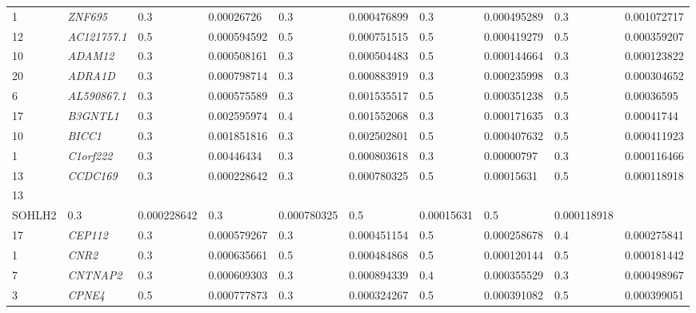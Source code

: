 \begin{refsection}
\begin{otherlanguage}{english}
\begin{scriptsize}
\begin{longtable}{llllllllll}
1 & \cellcolor[HTML]{CBCEFB}\textit{ZNF695} & 0.3 & 0.00026726 & 0.3 & 0.000476899 & 0.3 & \cellcolor[HTML]{CBCEFB}0.000495289 & 0.3 & 0.001072717 \\
12 & \cellcolor[HTML]{FE996B}\textit{AC121757.1} & 0.5 & 0.000594592 & 0.5 & 0.000751515 & 0.5 & 0.000419279 & 0.5 & 0.000359207 \\
10 & \cellcolor[HTML]{FE996B}\textit{ADAM12} & 0.3 & 0.000508161 & 0.3 & 0.000504483 & 0.5 & 0.000144664 & 0.3 & 0.000123822 \\
20 & \cellcolor[HTML]{FE996B}\textit{ADRA1D} & 0.3 & 0.000798714 & 0.3 & 0.000883919 & 0.3 & 0.000235998 & 0.3 & 0.000304652 \\
6 & \cellcolor[HTML]{FE996B}\textit{AL590867.1} & 0.3 & 0.000575589 & 0.3 & 0.001535517 & 0.5 & 0.000351238 & 0.5 & 0.00036595 \\
17 & \cellcolor[HTML]{FE996B}\textit{B3GNTL1} & 0.3 & 0.002595974 & 0.4 & 0.001552068 & 0.3 & 0.000171635 & 0.3 & 0.00041744 \\
10 & \cellcolor[HTML]{FE996B}\textit{BICC1} & 0.3 & 0.001851816 & 0.3 & 0.002502801 & 0.5 & 0.000407632 & 0.5 & 0.000411923 \\
1 & \cellcolor[HTML]{FE996B}\textit{C1orf222} & 0.3 & 0.00446434 & 0.3 & 0.000803618 & 0.3 & 0.00000797 & 0.3 & 0.000116466 \\
13 & \cellcolor[HTML]{FE996B}\textit{CCDC169} & 0.3 & \cellcolor[HTML]{FE996B}0.000228642 & 0.3 & 0.000780325 & 0.5 & 0.00015631 & 0.5 & 0.000118918 \\
13 & \cellcolor[HTML]{FE996B}\textit{\begin{tabular}[c]{@{}c@{}}CCDC169-\\ SOHLH2\end{tabular}} & 0.3 & \cellcolor[HTML]{FE996B}0.000228642 & 0.3 & 0.000780325 & 0.5 & \cellcolor[HTML]{FE996B}0.00015631 & 0.5 & 0.000118918 \\
17 & \cellcolor[HTML]{FE996B}\textit{CEP112} & 0.3 & 0.000579267 & 0.3 & \cellcolor[HTML]{FE996B}0.000451154 & 0.5 & 0.000258678 & 0.4 & 0.000275841 \\
1 & \cellcolor[HTML]{FE996B}\textit{CNR2} & 0.3 & 0.000635661 & 0.5 & \cellcolor[HTML]{FE996B}0.000484868 & 0.5 & 0.000120144 & 0.5 & 0.000181442 \\
7 & \cellcolor[HTML]{FE996B}\textit{CNTNAP2} & 0.3 & 0.000609303 & 0.3 & 0.000894339 & 0.4 & 0.000355529 & 0.3 & 0.000498967 \\
3 & \cellcolor[HTML]{FE996B}\textit{CPNE4} & 0.5 & 0.000777873 & 0.3 & \cellcolor[HTML]{FE996B}0.000324267 & 0.5 & 0.000391082 & 0.5 & 0.000399051 \\

\end{longtable}
\end{scriptsize}
\end{otherlanguage}
\end{refsection}
